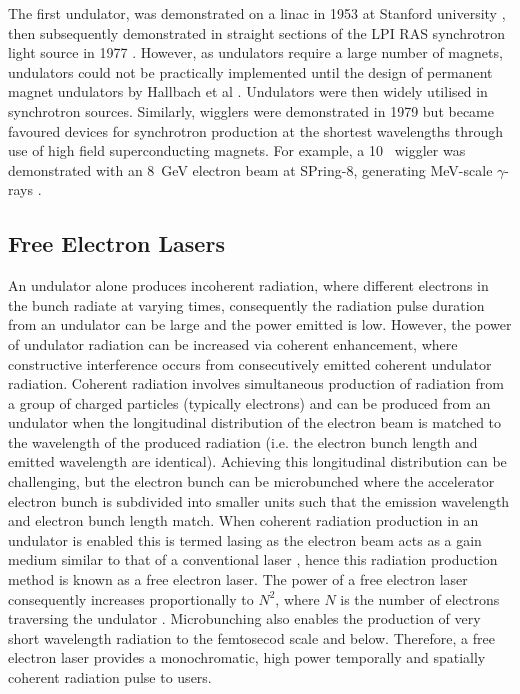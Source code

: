 \documentclass[../main.tex]{subfiles}
\begin{document}
The first undulator, was demonstrated on a linac in 1953 at Stanford university \cite{motz1953experiments}, then subsequently demonstrated in straight sections of the LPI RAS synchrotron light source in 1977 \cite{bessonov2010light}.  However, as undulators require a large number of magnets, undulators could not be practically implemented until the design of permanent magnet undulators by Hallbach et al \cite{halbach1983permanent}. Undulators were then widely utilised in synchrotron sources. Similarly, wigglers were demonstrated in 1979 \cite{berndt1979initial} but became favoured devices for synchrotron production at the shortest wavelengths through use of high field superconducting magnets. For example, a 10~\si{\Tesla} wiggler was demonstrated with an 8~\si{\giga\electronvolt} electron beam at SPring-8, generating \si{\mega\electronvolt}-scale $\gamma$-rays \cite{soutome2003generation}.    

\subsection{Free Electron Lasers}

An undulator alone produces incoherent radiation, where different electrons in the bunch radiate at varying times, consequently the radiation pulse duration from an undulator can be large and the power emitted is low. However, the power of undulator radiation can be increased via coherent enhancement, where constructive interference occurs from consecutively emitted coherent undulator radiation. Coherent radiation involves simultaneous production of radiation from a group of charged particles (typically electrons) and can be produced from an undulator when the longitudinal distribution of the electron beam is matched to the wavelength of the produced radiation (i.e. the electron bunch length and emitted wavelength are identical). Achieving this longitudinal distribution can be challenging, but the electron bunch can be microbunched where the accelerator electron bunch is subdivided into smaller units such that the emission wavelength and electron bunch length match. When coherent radiation production in an undulator is enabled this is termed lasing as the electron beam acts as a gain medium similar to that of a conventional laser \cite{brau1988free}, hence this radiation production method is known as a free electron laser. The power of a free electron laser consequently increases proportionally to $N^{2}$, where $N$ is the number of electrons traversing the undulator \cite{pellegrini2016physics}. Microbunching also enables the production of very short wavelength radiation to the femtosecod scale and below. Therefore, a free electron laser provides a monochromatic, high power temporally and spatially coherent radiation pulse to users.
\end{document}
